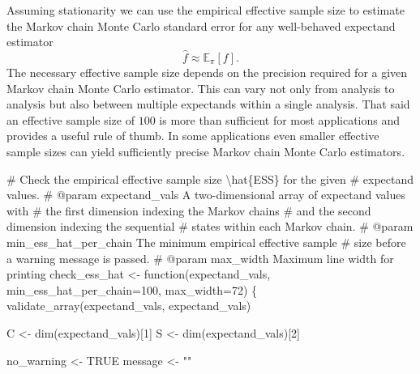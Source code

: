 \documentclass[
  letterpaper,
  DIV=11,
  numbers=noendperiod]{scrartcl}
\newenvironment{Shaded}{\begin{snugshade}}{\end{snugshade}}
\newcommand{\CommentTok}[1]{\textcolor[rgb]{0.37,0.37,0.37}{#1}}
\newcommand{\DecValTok}[1]{\textcolor[rgb]{0.68,0.00,0.00}{#1}}
\newcommand{\NormalTok}[1]{\textcolor[rgb]{0.00,0.23,0.31}{#1}}
\newcommand{\OperatorTok}[1]{\textcolor[rgb]{0.37,0.37,0.37}{#1}}
\newcommand{\StringTok}[1]{\textcolor[rgb]{0.13,0.47,0.30}{#1}}
\begin{document}
Assuming stationarity we can use the empirical effective sample size to
estimate the Markov chain Monte Carlo standard error for any
well-behaved expectand estimator \[
\hat{f} \approx \mathbb{E}_{\pi}[f].
\] The necessary effective sample size depends on the precision required
for a given Markov chain Monte Carlo estimator. This can vary not only
from analysis to analysis but also between multiple expectands within a
single analysis. That said an effective sample size of \(100\) is more
than sufficient for most applications and provides a useful rule of
thumb. In some applications even smaller effective sample sizes can
yield sufficiently precise Markov chain Monte Carlo estimators.

\begin{Shaded}
\begin{Highlighting}[]
\CommentTok{\# Check the empirical effective sample size \textbackslash{}hat\{ESS\} for the given}
\CommentTok{\# expectand values.}
\CommentTok{\# @param expectand\_vals A two{-}dimensional array of expectand values with}
\CommentTok{\#                       the first dimension indexing the Markov chains}
\CommentTok{\#                       and the second dimension indexing the sequential}
\CommentTok{\#                       states within each Markov chain.}
\CommentTok{\# @param min\_ess\_hat\_per\_chain The minimum empirical effective sample}
\CommentTok{\#                              size before a warning message is passed.}
\CommentTok{\# @param max\_width Maximum line width for printing}
\NormalTok{check\_ess\_hat }\OperatorTok{\textless{}{-}}\NormalTok{ function(expectand\_vals,}
\NormalTok{                          min\_ess\_hat\_per\_chain}\OperatorTok{=}\DecValTok{100}\NormalTok{,}
\NormalTok{                          max\_width}\OperatorTok{=}\DecValTok{72}\NormalTok{) \{}
\NormalTok{  validate\_array(expectand\_vals, }\StringTok{\textquotesingle{}expectand\_vals\textquotesingle{}}\NormalTok{)}

\NormalTok{  C }\OperatorTok{\textless{}{-}}\NormalTok{ dim(expectand\_vals)[}\DecValTok{1}\NormalTok{]}
\NormalTok{  S }\OperatorTok{\textless{}{-}}\NormalTok{ dim(expectand\_vals)[}\DecValTok{2}\NormalTok{]}
  
\NormalTok{  no\_warning }\OperatorTok{\textless{}{-}}\NormalTok{ TRUE}
\NormalTok{  message }\OperatorTok{\textless{}{-}} \StringTok{""}
  

\end{Highlighting}
\end{Shaded}
\end{document}
